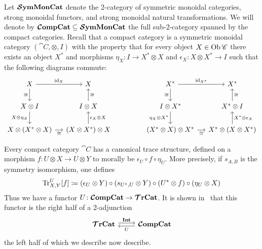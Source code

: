 \documentclass[12pt,oneside,article,draft]{memoir}
\begin{document}
Let $\bm{\mathcal{S}}\mathbf{ymMonCat}$ denote the 2-category of symmetric monoidal categories, strong monoidal functors,
and strong monoidal natural transformations. We will denote by $\bm{\mathcal{C}}\mathbf{ompCat}\subseteq\bm{\mathcal{S}}\mathbf{ymMonCat}$ the full
sub-2-category spanned by the compact categories.  Recall that a compact category is a symmetric
monoidal category $(\cat{C},\otimes,I)$ with the property that for every object $X\in\operatorname{Ob}\mathscr{C}$
there exists an object $X^*$ and morphisms $\eta_X\colon I\to X^*\otimes X$ and $\epsilon_X\colon
X\otimes X^*\to I$ such that the following diagrams commute:
\begin{equation*}
   \begin{tikzcd}[column sep=small]
      X\arrow[r,"\id_X"]\arrow[d,"\cong"'] & X \\
      X\otimes I\arrow[d,"X\otimes\eta_X"'] & I\otimes X\arrow[u,"\cong"'] \\
      X\otimes(X^*\otimes X)\arrow[r,"\cong"'] & (X\otimes X^*)\otimes X\arrow[u,"\epsilon_X\otimes X"']
   \end{tikzcd}
   \hspace{.6in}
   \begin{tikzcd}[column sep=small]
      X^*\arrow[r,"\id_{X^*}"]\arrow[d,"\cong"'] & X^*\\
      I\otimes X^*\arrow[d,"\eta_X\otimes X^*"'] & X^*\otimes I\arrow[u,"\cong"'] \\
      (X^*\otimes X)\otimes X^*\arrow[r,"\cong"'] & X^*\otimes (X\otimes X^*)\arrow[u,"X^*\otimes\epsilon_X"']
   \end{tikzcd}
\end{equation*}

Every compact category $\cat{C}$ has a canonical trace structure, defined on a morphism $f\colon
U\otimes X\to U\otimes Y$ to morally be $\epsilon_U\circ f\circ \eta_U$.  More precisely, if
$s_{A,B}$ is the symmetry isomorphism, one defines
\begin{equation*}
   \operatorname{Tr}^U_{X,Y}[f]\coloneqq(\epsilon_U\otimes Y)\circ (s_{U^*,U}\otimes Y)\circ (U^*\otimes f)\circ (\eta_U\otimes X)
\end{equation*}
Thus we have a functor $U\colon\bm{\mathcal{C}}\mathbf{ompCat}\to\bm{\mathcal{T}}\mathbf{rCat}$.  It is shown in~\cite{JoyalStreetVerity} that
this functor is the right half of a 2-adjunction
\begin{equation}\label{dia:traced compact adjunction}
\begin{tikzcd}
   \TTrCat\arrow[r,shift left=.5ex, "\Int"]&\CCompCat\arrow[l,shift left=.5ex,"U"]
\end{tikzcd}
\end{equation}
the left half of which we describe now describe.
\end{document}
